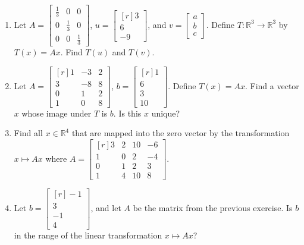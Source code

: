 \documentclass[12pt]{article}
\newcommand{\reals}{\mathbb{R}}
\begin{document}
\begin{multicols*}{2}
\begin{enumerate}
		\item Let $A = \begin{bmatrix}
			\frac{1}{3} & 0 & 0\\
			0 & \frac{1}{3} & 0\\
			0 & 0 & \frac{1}{3}
		\end{bmatrix}$, $u = \begin{bmatrix*}[r]
			3\\6\\-9
		\end{bmatrix*}$, and $v= \begin{bmatrix*}
			a\\b\\c
		\end{bmatrix*}$. Define $T:\reals^3\to \reals^3$ by $T(x) = Ax$. Find $T(u)$ and $T(v)$.
		\vfill

		\item Let $A = \begin{bmatrix*}[r]
			1 & -3 & 2\\
			3 & -8 & 8\\
			0 & 1 & 2\\
			1 & 0 & 8
		\end{bmatrix*}$, $b = \begin{bmatrix*}[r]
			1\\6\\3\\10
		\end{bmatrix*}$. Define $T(x) = Ax$. Find a vector $x$ whose image under $T$ is $b$. Is this $x$ unique?

		\vfill

		\item Find all $x\in \reals^4$ that are mapped into the zero vector by the transformation $x\mapsto Ax$ where $A = \begin{bmatrix*}[r]
			3 & 2 & 10 & -6\\
			1 & 0 & 2 & -4\\
			0 & 1 & 2 & 3\\
			1 & 4 & 10 & 8
		\end{bmatrix*}$.
		\vfill

		\item Let $b = \begin{bmatrix*}[r]
			-1\\3\\-1\\4
		\end{bmatrix*}$, and let $A$ be the matrix from the previous exercise. Is $b$ in the range of the linear transformation $x\mapsto Ax$?
		\vfill


\end{enumerate}
\end{multicols*}
\end{document}
